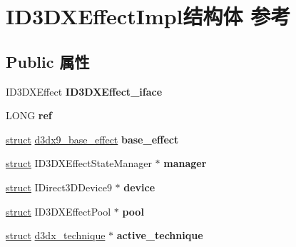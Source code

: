 \hypertarget{struct_i_d3_d_x_effect_impl}{}\section{I\+D3\+D\+X\+Effect\+Impl结构体 参考}
\label{struct_i_d3_d_x_effect_impl}
\subsection*{Public 属性}
\begin{DoxyCompactItemize}
\item 
\mbox{\label{struct_i_d3_d_x_effect_impl_acf77cebfb03a9c99ada8ccbd219d8549}} 
I\+D3\+D\+X\+Effect {\bfseries I\+D3\+D\+X\+Effect\+\_\+iface}
\item 
\mbox{\label{struct_i_d3_d_x_effect_impl_aae152739d3766bf9f4eb498d5fead70c}} 
L\+O\+NG {\bfseries ref}
\item 
\mbox{\label{struct_i_d3_d_x_effect_impl_ac500abdf789a485666ad117875d75e9c}} 
\hyperlink{interfacestruct}{struct} \hyperlink{structd3dx9__base__effect}{d3dx9\+\_\+base\+\_\+effect} {\bfseries base\+\_\+effect}
\item 
\mbox{\label{struct_i_d3_d_x_effect_impl_adbc350a37da52aa3349a1339dba6f66d}} 
\hyperlink{interfacestruct}{struct} I\+D3\+D\+X\+Effect\+State\+Manager $\ast$ {\bfseries manager}
\item 
\mbox{\label{struct_i_d3_d_x_effect_impl_a9c8a45fc2582cc20b527a323d6351532}} 
\hyperlink{interfacestruct}{struct} I\+Direct3\+D\+Device9 $\ast$ {\bfseries device}
\item 
\mbox{\label{struct_i_d3_d_x_effect_impl_a9a88121ff5fa917aba799ba4b234960e}} 
\hyperlink{interfacestruct}{struct} I\+D3\+D\+X\+Effect\+Pool $\ast$ {\bfseries pool}
\item 
\mbox{\label{struct_i_d3_d_x_effect_impl_af280d5427c8a087fc89b1beaaadf4d89}} 
\hyperlink{interfacestruct}{struct} \hyperlink{structd3dx__technique}{d3dx\+\_\+technique} $\ast$ {\bfseries active\+\_\+technique}

\end{DoxyCompactItemize}
